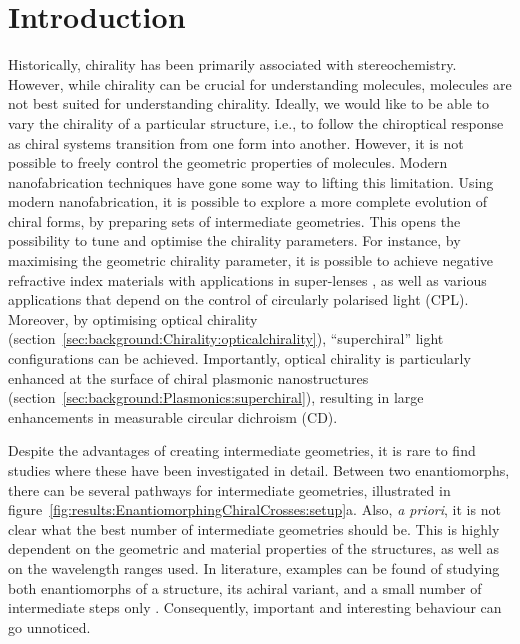 \section{Introduction}\label{sec:results:EnantiomorphingChiralCrosses:introduction}
Historically, chirality has been primarily associated with stereochemistry. However, while chirality can be crucial for understanding molecules, molecules are not best suited for understanding chirality. 
Ideally, we would like to be able to vary the chirality of a particular structure, i.e., to follow the chiroptical response as chiral systems transition from one form into another. However, it is not possible to freely control the geometric properties of molecules. Modern nanofabrication techniques have gone some way to lifting this limitation.
Using modern nanofabrication, it is possible to explore a more complete evolution of chiral forms, by preparing sets of intermediate geometries. This opens the possibility to tune and optimise the chirality parameters. For instance, by maximising the geometric chirality parameter, it is possible to achieve negative refractive index materials with applications in super-lenses \cite{Khorasaninejad2016}, as well as various applications that depend on the control of circularly polarised light (CPL). 
Moreover, by optimising optical chirality (section~\ref{sec:background:Chirality:opticalchirality}), ``superchiral'' light configurations can be achieved. Importantly, optical chirality is particularly enhanced at the surface of chiral plasmonic nanostructures (section~\ref{sec:background:Plasmonics:superchiral}), resulting in large enhancements in measurable circular dichroism (CD).

Despite the advantages of creating intermediate geometries, it is rare to find studies where these have been investigated in detail. Between two enantiomorphs, there can be several pathways for intermediate geometries, illustrated in figure~\ref{fig:results:EnantiomorphingChiralCrosses:setup}a. 
Also, \textit{a priori}, it is not clear what the best number of intermediate geometries should be. This is highly dependent on the geometric and material properties of the structures, as well as on the wavelength ranges used. In literature, examples can be found of studying both enantiomorphs of a structure, its achiral variant, and a small number of intermediate steps only \cite{Zu2016}. Consequently, important and interesting behaviour can go unnoticed.

